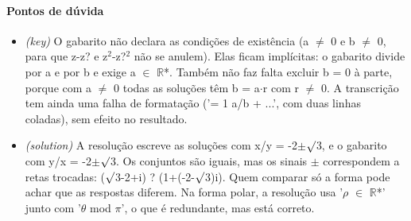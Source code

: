 \documentclass{article}%
\begin{document}
\paragraph{Pontos de dúvida}%
\begin{itemize}%
\item%
\textit{(key)} O gabarito não declara as condições de existência (a $\neq$ 0 e b $\neq$ 0, para que z-z? e z$^2$-z?$^2$ não se anulem). Elas ficam implícitas: o gabarito divide por a e por b e exige a $\in$ $\mathbb{R}$*. Também não faz falta excluir b = 0 à parte, porque com a $\neq$ 0 todas as soluções têm b = a$\cdot$r com r $\neq$ 0. A transcrição tem ainda uma falha de formatação ('= 1 a/b + ...', com duas linhas coladas), sem efeito no resultado.%
\item%
\textit{(solution)} A resolução escreve as soluções com x/y = -2$\pm$$\surd$3, e o gabarito com y/x = -2$\pm$$\surd$3. Os conjuntos são iguais, mas os sinais $\pm$ correspondem a retas trocadas: ($\surd$3-2+i) ? (1+(-2-$\surd$3)i). Quem comparar só a forma pode achar que as respostas diferem. Na forma polar, a resolução usa '$\rho$ $\in$ $\mathbb{R}$*' junto com '$\theta$ mod $\pi$', o que é redundante, mas está correto.%
\end{itemize}%
\end{document}
